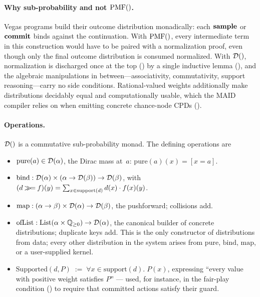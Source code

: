 \documentclass[11pt]{article}
\begin{document}
\paragraph{Why sub-probability and not $\mathrm{PMF}()$.}
Vegas programs build their outcome distribution monadically: each
$\mathbf{sample}$ or $\mathbf{commit}$ binds against the continuation. With $\mathrm{PMF}()$,
every intermediate term in this construction would have to be paired with
a normalization proof, even though only the final outcome distribution is
consumed normalized. With $\mathcal{D}()$, normalization is discharged once at
the top () by a single inductive lemma
(), and the algebraic
manipulations in between---associativity, commutativity, support
reasoning---carry no side conditions. Rational-valued weights additionally
make distributions decidably equal and computationally usable, which the
MAID compiler relies on when emitting concrete chance-node CPDs
().

\paragraph{Operations.}
$\mathcal{D}()$ is a commutative sub-probability monad. The defining operations
are
\begin{itemize}[nosep]
\item $\mathrm{pure}(a) \in \mathcal{D}(\alpha)$, the Dirac mass at~$a$:
      $\mathrm{pure}(a)(x) = [x = a]$.
\item $\mathrm{bind} : \mathcal{D}(\alpha) \times (\alpha \to \mathcal{D}(\beta))
      \to \mathcal{D}(\beta)$, with
      $(d \mathbin{\gg\!=} f)(y) =
        \sum_{x \in \mathrm{support}(d)} d(x) \cdot f(x)(y)$.
\item $\mathrm{map} : (\alpha \to \beta) \times \mathcal{D}(\alpha)
      \to \mathcal{D}(\beta)$, the pushforward; collisions add.
\item $\mathrm{ofList} : \mathrm{List}(\alpha \times \mathbb{Q}_{\ge 0}) \to \mathcal{D}(\alpha)$,
      the canonical builder of concrete distributions; duplicate keys
      add. This is the only constructor of distributions from data; every
      other distribution in the system arises from $\mathrm{pure}$,
      $\mathrm{bind}$, $\mathrm{map}$, or a user-supplied kernel.
\item $\mathrm{Supported}(d, P) \;:=\; \forall x \in \mathrm{support}(d).\;
      P(x)$, expressing ``every value with positive weight satisfies $P$''
      --- used, for instance, in the fair-play condition
      () to require that committed actions satisfy
      their guard.
\end{itemize}
\end{document}

